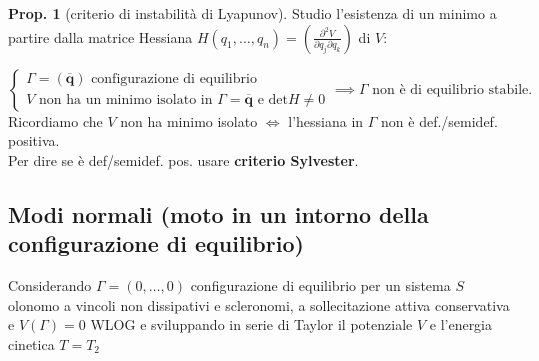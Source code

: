 \documentclass[a4paper,10pt]{article}
\theoremstyle{definition}
\newcommand{\bv}{\boldsymbol} %
\theoremstyle{indentdefinition}
\theoremstyle{indenttheorem}
\newtheorem{prop}{Prop.}
\theoremstyle{myremark}
\theoremstyle{indentgeneral}
\begin{document}
\begin{prop}[criterio di instabilità di Lyapunov]
Studio l'esistenza di un minimo a partire dalla matrice Hessiana
$H\left(q_{1},\dots,q_{n}\right)=\left(\frac{\partial^{2}V}{\partial q_{j}\partial q_{k}}\right)$
di $V$:

$$\begin{cases}
    \Gamma=\left(\overline{\bv{q}}\right) \text{ configurazione di equilibrio} \\
     V \text{ non ha un minimo isolato in $\Gamma={\bv{\overline{q}}}$  e det$H\ne0$}
\end{cases} \implies \text{$\Gamma$ non è di equilibrio
stabile.}$$
Ricordiamo che $V$ non ha minimo isolato $\iff$ l'hessiana in $\Gamma$ non è def./semidef. positiva.   \\
Per dire se è def/semidef. pos. usare \textbf{criterio  Sylvester}.

\end{prop}

\subsection{Modi normali (moto in un intorno della configurazione di equilibrio)}

Considerando $\Gamma=\left(0,\dots,0\right)$ configurazione di equilibrio
per un sistema $S$ olonomo a vincoli non dissipativi e scleronomi,
a sollecitazione attiva conservativa e $V\left(\Gamma\right)=0$ WLOG
e sviluppando in serie di Taylor il potenziale $V$ e l'energia cinetica
$T=T_{2}$
\end{document}
